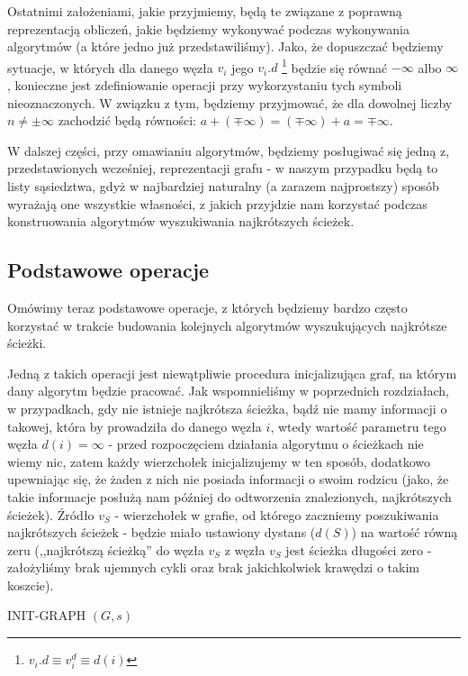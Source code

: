Ostatnimi założeniami, jakie przyjmiemy, będą te związane z poprawną reprezentacją obliczeń, jakie będziemy wykonywać podczas wykonywania algorytmów (a które jedno już przedstawiliśmy). Jako, że dopuszczać będziemy sytuacje, w których dla danego węzła $v_{i}$ jego $v_{i}.d$ \footnote{$v_{i}.d \equiv v_{i}^{d} \equiv d \left( i\right)$} będzie się równać $- \infty$ albo $\infty$, konieczne jest zdefiniowanie operacji przy wykorzystaniu tych symboli nieoznaczonych. W związku z tym, będziemy przyjmować, że dla dowolnej liczby $n \neq \pm \infty$ zachodzić będą równości: $ a + \left( \mp \infty \right) = \left( \mp \infty \right) + a = \mp \infty$.

W dalszej części, przy omawianiu algorytmów, będziemy posługiwać się jedną z, przedstawionych wcześniej, reprezentacji grafu - w naszym przypadku będą to listy sąsiedztwa, gdyż w najbardziej naturalny (a zarazem najprostszy) sposób wyrażają one wszystkie własności, z jakich przyjdzie nam korzystać podczas konstruowania algorytmów wyszukiwania najkrótszych ścieżek.

\subsection{Podstawowe operacje}

Omówimy teraz podstawowe operacje, z których będziemy bardzo często korzystać w trakcie budowania kolejnych algorytmów wyszukujących najkrótsze ścieżki.

Jedną z takich operacji jest niewątpliwie procedura inicjalizująca graf, na którym dany algorytm będzie pracować. Jak wspomnieliśmy w poprzednich rozdziałach, w przypadkach, gdy nie istnieje najkrótsza ścieżka, bądź nie mamy informacji o takowej, która by prowadziła do danego węzła $i$, wtedy wartość parametru tego węzła $d \left( i \right) = \infty$ - przed rozpoczęciem działania algorytmu o ścieżkach nie wiemy nic, zatem każdy wierzchołek inicjalizujemy w ten sposób, dodatkowo upewniając się, że żaden z nich nie posiada informacji o swoim rodzicu (jako, że takie informacje posłużą nam później do odtworzenia znalezionych, najkrótszych ścieżek). Źródło $v_{S}$ - wierzchołek w grafie, od którego zaczniemy poszukiwania najkrótszych ścieżek - będzie miało ustawiony dystans ($d \left( S \right)$) na wartość równą zeru (,,najkrótszą ścieżką'' do węzła $v_{S}$ z węzła $v_{S}$ jest ścieżka długości zero - założyliśmy brak ujemnych cykli oraz brak jakichkolwiek krawędzi o takim koszcie).

\begin{algorithm}[!htbp]
\DontPrintSemicolon
{}
\caption{INIT-GRAPH $\left( G, s \right)$\label{alg:init-graph}}
\end{algorithm}

